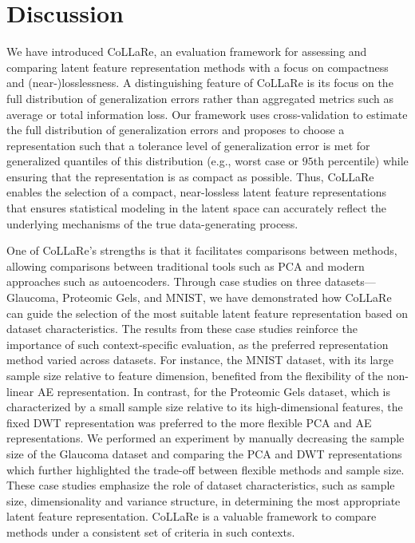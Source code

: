 \section{Discussion}\label{sec:discussion}

We have introduced CoLLaRe, an evaluation framework for assessing and comparing latent feature representation methods with a focus on compactness and (near-)losslessness.
A distinguishing feature of CoLLaRe is its focus on the full distribution of generalization errors rather than aggregated metrics such as average or total information loss.
Our framework uses cross-validation to estimate the full distribution of generalization errors and proposes to choose a representation such that a tolerance level of generalization error is met for generalized quantiles of this distribution (e.g., worst case or $95$th percentile) while ensuring that the representation is as compact as possible.
Thus, CoLLaRe enables the selection of a compact, near-lossless latent feature representations that ensures statistical modeling in the latent space can accurately reflect the underlying mechanisms of the true data-generating process.




One of CoLLaRe's strengths is that it facilitates comparisons between methods, allowing comparisons between traditional tools such as PCA and modern approaches such as autoencoders. 
Through case studies on three datasets—Glaucoma, Proteomic Gels, and MNIST, we have demonstrated how CoLLaRe can guide the selection of the most suitable latent feature representation based on dataset characteristics.
The results from these case studies reinforce the importance of such context-specific evaluation, as the preferred representation method varied across datasets. 
For instance, the MNIST dataset, with its large sample size relative to feature dimension, benefited from the flexibility of the non-linear AE representation. 
In contrast, for the Proteomic Gels dataset, which is characterized by a small sample size relative to its high-dimensional features, the fixed DWT representation was preferred to the more flexible PCA and AE representations.
We performed an experiment by manually decreasing the sample size of the Glaucoma dataset and comparing the PCA and DWT representations which further highlighted the trade-off between flexible methods and sample size.
These case studies emphasize the role of dataset characteristics, such as sample size, dimensionality and variance structure, in determining the most appropriate latent feature representation. 
CoLLaRe is a valuable framework to compare methods under a consistent set of criteria in such contexts.

